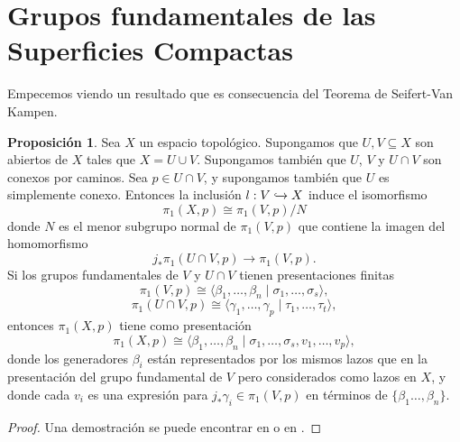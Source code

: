 \documentclass[10pt]{report}
\theoremstyle{definition}
\newtheorem{prop}[defin]{Proposición}
\begin{document}
\section{Grupos fundamentales de las Superficies Compactas}
Empecemos viendo un resultado que es consecuencia del Teorema de Seifert-Van Kampen.
\begin{prop}\label{teo:svk}
Sea $X$ un espacio topológico. Supongamos que $U,V\subseteq X$ son abiertos de $X$ tales que $X=U\cup V$. Supongamos también que $U$, $V$ y $U\cap V$ son conexos por caminos. Sea $p\in U\cap V$, y supongamos también que $U$ es simplemente conexo. Entonces la inclusión $l: V\xhookrightarrow{} X$ induce el isomorfismo
\[
\pi_1 (X,p) \cong \pi_1 (V,p) / N
\]
donde $N$ es el menor subgrupo normal de $\pi_1 (V,p)$ que contiene la imagen del homomorfismo 
\[ 
j_* \pi_1 (U\cap V, p) \to \pi_1 (V,p).
\]
Si los grupos fundamentales de $V$ y $U\cap V$ tienen presentaciones finitas
\[
\pi_1 (V,p) \cong \langle \beta_1 , \dots , \beta_n \mid \sigma_1 , \dots ,\sigma_s \rangle 
,
\]
\[
\pi_1 (U\cap V, p) \cong \langle \gamma_1 , \dots , \gamma_p \mid \tau_1 ,\dots , \tau_t \rangle ,
\]
entonces $\pi_1 (X, p)$ tiene como presentación 
\[
\pi_1 (X,p) \cong \langle \beta_1 , \dots , \beta_n \mid \sigma_1 , \dots ,\sigma_s , v_1 , \dots ,v_p \rangle,
\]
donde  los generadores $\beta_i$ están representados por los mismos lazos que en la presentación del grupo fundamental de $V$ pero considerados como lazos en $X$, y donde cada $v_i$ es una expresión para $j_* \gamma_i \in \pi_1 (V,p)$ en términos de $\{ \beta_1 \dots ,\beta_n \}$.
\end{prop}
\begin{proof}
Una demostración se puede encontrar en \cite{lee1} o en \cite{munkres}.
\end{proof}
\end{document}
